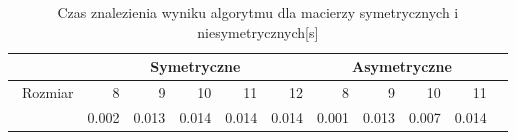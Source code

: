 \begin{table}
\centering
\begin{tabular}{|r|r|r|r|r|r|r|r|r|r|r|}
\hline
 & \multicolumn{5}{|c|}{Symetryczne} & \multicolumn{4}{|c|}{Asymetryczne} \\ \hline\
Rozmiar & 8 & 9 & 10 & 11 & 12 & 8 & 9 & 10 & 11 \\ \hline
 & 0.002 & 0.013 & 0.014 & 0.014 & 0.014 & 0.001 & 0.013 & 0.007 & 0.014 \\ \hline
\end{tabular}
\caption{Czas znalezienia wyniku algorytmu dla macierzy symetrycznych i niesymetrycznych[s]}
\label{tab:time_PrevAn}
\end{table}

